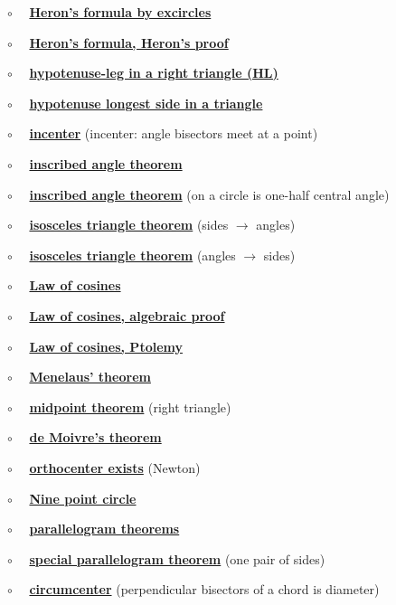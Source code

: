 \documentclass[11pt, oneside]{article}
\begin{document}
$\circ$ \ \ \hyperref[sec:Heron_formula_excircles]{\textbf{Heron's formula by excircles}}

$\circ$ \ \ \hyperref[sec:Heron_formula_Heron]{\textbf{Heron's formula, Heron's proof}}

$\circ$ \ \ \hyperref[sec:SSA_in_right]{\textbf{hypotenuse-leg in a right triangle (HL)}}

$\circ$ \ \ \hyperref[sec:hypotenuse_longest]{\textbf{hypotenuse longest side in a triangle}}

$\circ$ \ \ \hyperref[sec:incenter]{\textbf{incenter}} (incenter:  angle bisectors meet at a point)

$\circ$ \ \ \hyperref[sec:equal_angles_same_arc]{\textbf{inscribed angle theorem}}

$\circ$ \ \ \hyperref[sec:peripheral_angle]{\textbf{inscribed angle theorem}} (on a circle is one-half central angle)

$\circ$ \ \  \hyperref[sec:isosceles_triangle_theorem]{\textbf{isosceles triangle theorem}} (sides $\rightarrow$ angles)

$\circ$ \ \  \hyperref[sec:isosceles_converse]{\textbf{isosceles triangle theorem}} (angles $\rightarrow$ sides)

$\circ$ \ \ \hyperref[sec:law_of_cosines]{\textbf{Law of cosines}}

$\circ$ \ \ \hyperref[sec:law_of_cosines_algebraic]{\textbf{Law of cosines, algebraic proof}}

$\circ$ \ \ \hyperref[sec:LOC_by_Ptolemy]{\textbf{Law of cosines, Ptolemy}}

$\circ$ \ \ \hyperref[sec:Menelaus_theorem]{\textbf{Menelaus' theorem}}

$\circ$ \ \ \hyperref[sec:right_triangle_midpoint_theorem]{\textbf{midpoint theorem}} (right triangle)

$\circ$ \ \ \hyperref[sec:de_Moivre_theorem]{\textbf{de Moivre's theorem}}

$\circ$ \ \ \hyperref[sec:Newton_altitude]{\textbf{orthocenter exists}}  (Newton)

$\circ$ \ \ \hyperref[sec:nine_point_circle]{\textbf{Nine point circle}}

$\circ$ \ \ \hyperref[sec:parallelogram_theorems]{\textbf{parallelogram theorems}}

$\circ$ \ \ \hyperref[sec:one_pair_of_sides]{\textbf{special parallelogram theorem}} (one pair of sides)

$\circ$ \ \ \hyperref[sec:perpendicular_bisector_of_a_chord]{\textbf{circumcenter}} (perpendicular bisectors of a chord is diameter)
\end{document}
